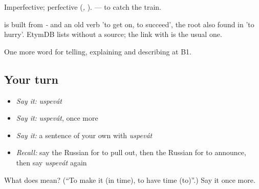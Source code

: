 Imperfective; perfective \emph{} (\emph{, }). \emph{  } — to catch the train.

\begin{cousinweb}
\emph{} is built from \emph{-} and an old verb \emph{} 'to get on, to succeed', the root also found in \emph{} 'to hurry'. EtymDB lists \emph{} without a source; the link with \emph{} is the usual one.
\end{cousinweb}

\begin{grammarlens}[title={What you've built}]
One more word for telling, explaining and describing at B1.
\end{grammarlens}

\subsection*{Your turn}
\begin{itemize}
\raggedright
  \item \emph{Say it:} \emph{uspevát}
  \item \emph{Say it:} \emph{uspevát}, once more
  \item \emph{Say it:} a sentence of your own with \emph{uspevát}
  \item \emph{Recall:} say the Russian for to pull out, then the Russian for to announce, then say \emph{uspevát} again
\end{itemize}

\begin{tcolorbox}[breakable,colback=teal!4,colframe=teal!35!black,title={Before you move on}]
What does  mean? (\textquotedblleft{}To make it (in time), to have time (to)\textquotedblright{}.) Say it once more.
\end{tcolorbox}
